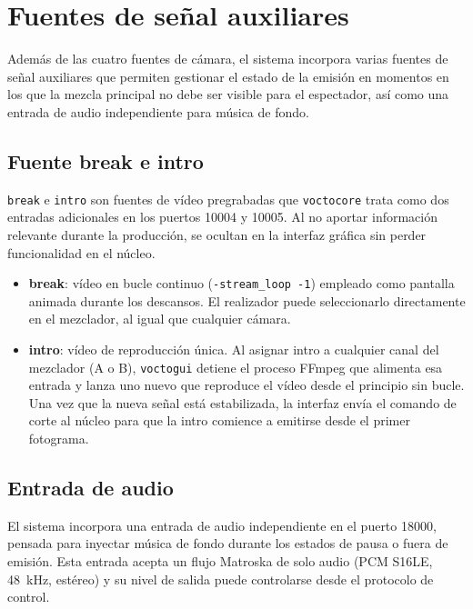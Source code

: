 \section{Fuentes de señal auxiliares}
\label{sec:fuentes_auxiliares}

Además de las cuatro fuentes de cámara, el sistema incorpora varias fuentes de señal
auxiliares que permiten gestionar el estado de la emisión en momentos en los que la
mezcla principal no debe ser visible para el espectador, así como una entrada de audio
independiente para música de fondo.

\subsection{Fuente break e intro}

\texttt{break} e \texttt{intro} son fuentes de vídeo pregrabadas que \texttt{voctocore} trata
como dos entradas adicionales en los puertos 10004 y 10005. Al no aportar información
relevante durante la producción, se ocultan en la interfaz gráfica sin perder
funcionalidad en el núcleo.

\begin{itemize}
  \item \textbf{break}: vídeo en bucle continuo (\texttt{-stream\_loop -1}) empleado
        como pantalla animada durante los descansos. El realizador puede seleccionarlo
        directamente en el mezclador, al igual que cualquier cámara.
  \item \textbf{intro}: vídeo de reproducción única. Al asignar intro a cualquier
        canal del mezclador (A o B), \texttt{voctogui} detiene el proceso FFmpeg que alimenta
        esa entrada y lanza uno nuevo que reproduce el vídeo desde el principio sin
        bucle. Una vez que la nueva señal está estabilizada, la interfaz envía el
        comando de corte al núcleo para que la intro comience a emitirse desde el
        primer fotograma.
\end{itemize}

\subsection{Entrada de audio}

El sistema incorpora una entrada de audio independiente en el puerto 18000, pensada
para inyectar música de fondo durante los estados de pausa o fuera de emisión. Esta
entrada acepta un flujo Matroska de solo audio (PCM S16LE, 48~kHz, estéreo) y su
nivel de salida puede controlarse desde el protocolo de control.

